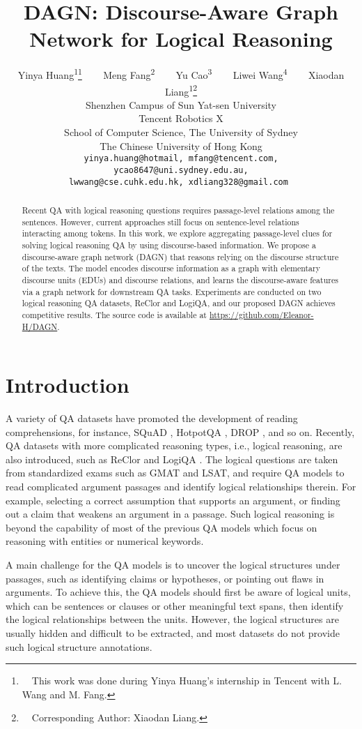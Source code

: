 \documentclass[11pt]{article}
\title{
DAGN: Discourse-Aware Graph Network for Logical Reasoning
}
\author{
  Yinya Huang\textsuperscript{1}\thanks{~~This work was done during Yinya Huang's internship in Tencent with L. Wang and M. Fang.} ~~~
  Meng Fang\textsuperscript{2} ~~~
  Yu Cao\textsuperscript{3} ~~~
  Liwei Wang\textsuperscript{4} ~~~
  Xiaodan Liang\textsuperscript{1}\thanks{~~Corresponding Author: Xiaodan Liang.} \\
  
  Shenzhen Campus of Sun Yat-sen University \\
  Tencent Robotics X \\
  School of Computer Science, The University of Sydney \\
  The Chinese University of Hong Kong \\
  
  \tt yinya.huang@hotmail,
  \tt mfang@tencent.com, \\
  \tt ycao8647@uni.sydney.edu.au, \\
  \tt lwwang@cse.cuhk.edu.hk,
  \tt xdliang328@gmail.com
}
\newcommand{\moe}[1]{{\color{black} #1}}
\begin{document}
\maketitle
\begin{abstract}
Recent QA with logical reasoning questions requires passage-level relations among the sentences. However, current approaches still focus on sentence-level relations interacting among tokens. In this work, we explore aggregating passage-level clues for solving logical reasoning QA by using discourse-based information. We propose a discourse-aware graph network (DAGN) that reasons relying on the discourse structure of the texts. The model encodes discourse information as a graph with elementary discourse units (EDUs) and discourse relations, and learns the discourse-aware features via a graph network for downstream QA tasks. Experiments are conducted on two logical reasoning QA datasets, ReClor and LogiQA, and our proposed DAGN achieves competitive results. The source code is available at \href{https://github.com/Eleanor-H/DAGN}{https://github.com/Eleanor-H/DAGN}.


\end{abstract}

\section{Introduction}
\vspace{-1mm}
A variety of QA datasets have promoted the development of reading comprehensions, for instance, SQuAD \cite{rajpurkar2016squad}, HotpotQA \cite{yang2018hotpotqa}, DROP \cite{dua2019drop}, \moe{and so on}. 
Recently, QA datasets with more complicated reasoning types, i.e., logical reasoning, are also introduced, such as ReClor \cite{yu2020reclor} and LogiQA \cite{liu2020logiqa}. 
The logical questions are taken from standardized exams such as GMAT and LSAT, and require QA models to read complicated argument passages and 
\moe{identify logical relationships therein. For example, selecting a correct assumption that supports an argument, or finding out a claim that weakens an argument in a passage.} 
Such logical reasoning is beyond the capability of most of the previous QA models which focus on reasoning with entities or numerical keywords.


A main challenge for the QA models is to uncover the logical structures under passages, such as identifying claims or hypotheses, or pointing out flaws in arguments. To achieve this, the QA models should first be aware of logical units, which can be sentences or clauses or other meaningful text spans, then identify the logical relationships between the units. 
However, the logical structures are usually hidden \moe{and difficult to be extracted}, \moe{and most datasets do not provide such logical structure annotations.}
\end{document}
